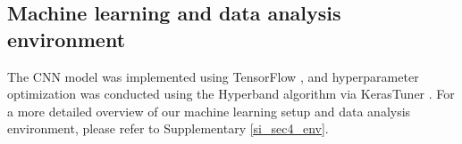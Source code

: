 \subsection{Machine learning and data analysis environment}
The CNN model was implemented using TensorFlow \cite{abadi2016tensorflow}, and hyperparameter optimization was conducted using the Hyperband \cite{li2018hyperband} algorithm via KerasTuner \cite{omalley2019kerastuner}.
For a more detailed overview of our machine learning setup and data analysis environment, please refer to Supplementary \cref{si_sec4_env}.
